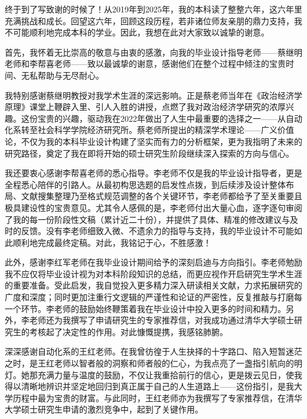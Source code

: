 
\begin{acknowledgements}

终于到了写致谢的时候了！从2019年到2025年，我的本科读了整整六年，这六年里充满挑战和成长。回望这六年，回顾这段历程，若非诸位师友亲朋的鼎力支持，我不可能顺利地完成本科的学业。因此，我想在此对大家致以诚挚的谢意。

​首先，我怀着无比崇高的敬意与由衷的感激，向我的毕业设计指导老师——蔡继明老师和李帮喜老师——致以最诚挚的谢意，感谢他们在整个过程中倾注的宝贵时间、无私帮助与无尽耐心。

我特别感谢蔡继明教授对我学术生涯的深远影响。正是蔡老师当年在《政治经济学原理》课堂上鞭辟入里、引人入胜的讲授，点燃了我对政治经济学研究的浓厚兴趣。这份宝贵的兴趣，驱动我在2022年做出了人生中最重要的选择之一——从自动化系转至社会科学学院经济研究所。蔡老师所提出的精深学术理论——广义价值论，不仅为我的本科毕业设计构建了坚实而有力的分析框架，更为我指明了未来的研究路径，奠定了我在即将开始的硕士研究生阶段继续深入探索的方向与信心。

我还要衷心感谢李帮喜老师的悉心指导。李老师不仅是我的毕业设计指导者，更是全程悉心陪伴的引路人。从最初构思选题的启发性点拨，到后续涉及设计整体布局、文献搜集整理乃至格式规范调整的各个关键环节，李老师都给予了至关重要且极具建设性的宝贵意见。尤其令人感佩的是，李老师付出大量心血，逐字逐句审阅了我的每一份阶段性文稿（累计近二十份），并提供了具体、精准的修改建议与及时的反馈。没有李老师细致入微、不遗余力的指导与支持，我的毕业设计不可能如此顺利地完成最终定稿。对此，我铭记于心，不胜感激！​

此外，感谢李红军老师在我毕业设计期间给予的深刻启迪与方向指引。李老师勉励我不应仅将毕业设计视为对本科阶段知识的总结，而更应视作开启研究生学术生涯的重要准备。受此启发，我自觉投入更多精力深入研读相关文献，力求拓展研究的广度和深度；同时更加注重行文逻辑的严谨性和论证的严密性，反复推敲与打磨每一个环节。李老师的鼓励始终鞭策着我在毕业设计中投入更多的时间和精力。​另外，李老师还为我撰写了申请研究生的专家推荐信，对我成功通过清华大学硕士研究生的考核起了决定性的作用。对此慷慨提携，我感铭肺腑。

深深感谢自动化系的王红老师。在我曾彷徨于人生抉择的十字路口、陷入短暂迷茫之时，是王红老师以智者般的洞察和师者般的仁心，为我点亮了一盏指引航向的明灯。她那充满力量与温度的鼓励，不仅让我重拾前行的信心，更是拨云见日，使我得以清晰地辨识并坚定地回归到真正属于自己的人生道路上——这份指引，是我大学历程中最为宝贵的财富。与此同时，王红老师亦为我撰写了专家推荐信，在清华大学硕士研究生申请的激烈竞争中，起到了关键作用。


\end{acknowledgements}
